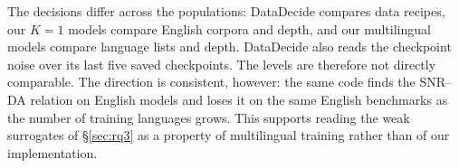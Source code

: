 The decisions differ across the populations: DataDecide compares data recipes, our $K=1$ models compare English corpora and depth, and our multilingual models compare language lists and depth. DataDecide also reads the checkpoint noise over its last five saved checkpoints. The levels are therefore not directly comparable. The direction is consistent, however: the same code finds the SNR--DA relation on English models and loses it on the same English benchmarks as the number of training languages grows. This supports reading the weak surrogates of \S\ref{sec:rq3} as a property of multilingual training rather than of our implementation.
